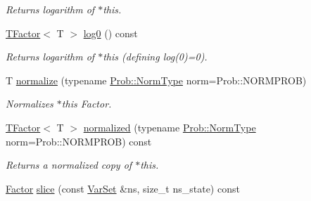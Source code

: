 \begin{CompactItemize}
\begin{CompactList}\small\item\em Returns logarithm of $\ast$this. \item\end{CompactList}\item 
\hypertarget{classdai_1_1TFactor_72b37d26ccac6edb39e71209bb675ba7}{
\hyperlink{classdai_1_1TFactor}{TFactor}$<$ T $>$ \hyperlink{classdai_1_1TFactor_72b37d26ccac6edb39e71209bb675ba7}{log0} () const }
\label{classdai_1_1TFactor_72b37d26ccac6edb39e71209bb675ba7}

\begin{CompactList}\small\item\em Returns logarithm of $\ast$this (defining log(0)=0). \item\end{CompactList}\item 
\hypertarget{classdai_1_1TFactor_c69a94a4d055c3cac107b2a55bb42944}{
T \hyperlink{classdai_1_1TFactor_c69a94a4d055c3cac107b2a55bb42944}{normalize} (typename \hyperlink{classdai_1_1TProb_31d9206096f52574dbd24cbb2502080c}{Prob::NormType} norm=Prob::NORMPROB)}
\label{classdai_1_1TFactor_c69a94a4d055c3cac107b2a55bb42944}

\begin{CompactList}\small\item\em Normalizes $\ast$this Factor. \item\end{CompactList}\item 
\hypertarget{classdai_1_1TFactor_df4740f4558ed9bc27029c0c362923e2}{
\hyperlink{classdai_1_1TFactor}{TFactor}$<$ T $>$ \hyperlink{classdai_1_1TFactor_df4740f4558ed9bc27029c0c362923e2}{normalized} (typename \hyperlink{classdai_1_1TProb_31d9206096f52574dbd24cbb2502080c}{Prob::NormType} norm=Prob::NORMPROB) const }
\label{classdai_1_1TFactor_df4740f4558ed9bc27029c0c362923e2}

\begin{CompactList}\small\item\em Returns a normalized copy of $\ast$this. \item\end{CompactList}\item 
\hypertarget{classdai_1_1TFactor_7cc9e6bca2b9c187f8d907942264508f}{
\hyperlink{classdai_1_1TFactor}{Factor} \hyperlink{classdai_1_1TFactor_7cc9e6bca2b9c187f8d907942264508f}{slice} (const \hyperlink{classdai_1_1VarSet}{VarSet} \&ns, size\_\-t ns\_\-state) const }
\label{classdai_1_1TFactor_7cc9e6bca2b9c187f8d907942264508f}


\end{CompactItemize}
